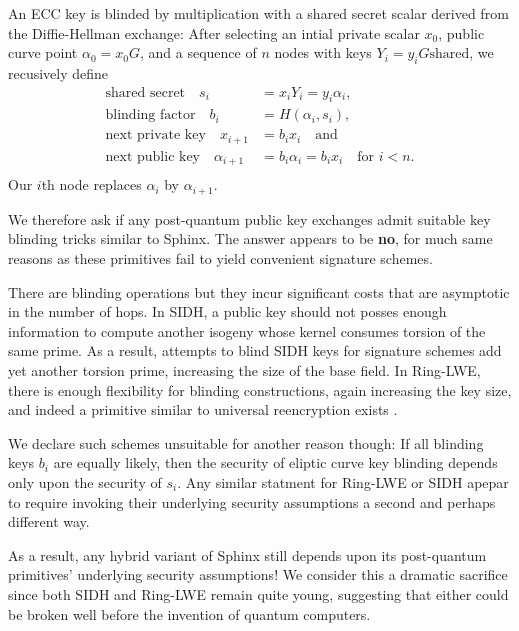 \documentclass[twoside,letterpaper]{sig-alternate}
\def\mathcomma{,}
\begin{document}
An ECC key is blinded by multiplication with a shared secret scalar
derived from the Diffie-Hellman exchange:
After selecting an intial private scalar $x_0$,
 public curve point $\alpha_0 = x_0 G$, and 
 a sequence of $n$ nodes with keys $Y_i = y_i G \textrm{shared}$,
we recusively define 
\[ \begin{aligned}
\textrm{shared secret}\quad
 s_i &= x_i Y_i = y_i \alpha_i \mathcomma \\
\textrm{blinding factor}\quad
 b_i &= H(\alpha_i,s_i) \mathcomma \\
\textrm{next private key}\quad
 x_{i+1} &= b_i x_i \quad\textrm{and} \\
\textrm{next public key}\quad
 \alpha_{i+1} &= b_i \alpha_i = b_i x_i \quad\textrm{for $i < n$.} \\
\end{aligned} \]
Our $i$th node replaces $\alpha_i$ by $\alpha_{i+1}$.

\smallskip

We therefore ask if any post-quantum public key exchanges admit 
suitable key blinding tricks similar to Sphinx. 
The answer appears to be {\bf no}, for much same reasons as 
these primitives fail to yield convenient signature schemes. 

There are blinding operations but they  incur significant costs 
that are asymptotic in the number of hops.
%
In SIDH, a public key should not posses enough information to compute
another isogeny whose kernel consumes torsion of the same prime. 
As a result, attempts to blind SIDH keys for signature schemes add
yet another torsion prime, increasing the size of the base field.
%
In Ring-LWE, there is enough flexibility for blinding constructions,
again increasing the key size, and indeed a primitive similar to
universal reencryption exists \cite{963628}.

We declare such schemes unsuitable for another reason though: 
%
If all blinding keys $b_i$ are equally likely, then the security of
eliptic curve key blinding depends only upon the security of $s_i$.
%
Any similar statment for Ring-LWE or SIDH apepar to require invoking
their underlying security assumptions a second and perhaps different way. 

As a result, any hybrid variant of Sphinx still depends upon its
post-quantum primitives' underlying security assumptions! 
%
We consider this a dramatic sacrifice since both SIDH and Ring-LWE
remain quite young, suggesting that either could be broken well
 before the invention of quantum computers.
\end{document}

